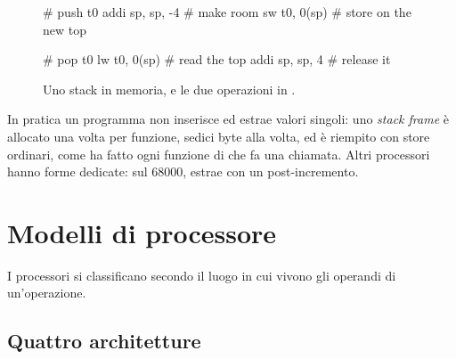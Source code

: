 \begin{figure}[htb]
\centering
\begin{minipage}{0.42\textwidth}\centering
{}
\end{minipage}
\begin{minipage}{0.5\textwidth}
\begin{asm}[numbers=none,xleftmargin=4pt,basicstyle=\ttfamily\footnotesize]
# push t0
addi sp, sp, -4      # make room
sw   t0, 0(sp)       # store on the new top

# pop t0
lw   t0, 0(sp)       # read the top
addi sp, sp, 4       # release it
\end{asm}
\end{minipage}
\caption{Uno stack in memoria, e le due operazioni in \riscv.}
\label{fig:cpu:stack}
\end{figure}

In pratica un programma \riscv non inserisce ed estrae valori singoli: uno
\emph{stack frame} è allocato una volta per funzione, sedici byte alla volta,
ed è riempito con store ordinari, come ha fatto ogni funzione di \vermone che
fa una chiamata. Altri processori hanno forme dedicate: sul 68000,
 estrae con un post-incremento.

\section{Modelli di processore}

I processori si classificano secondo il luogo in cui vivono gli operandi di
un'operazione.

\subsection{Quattro architetture}

